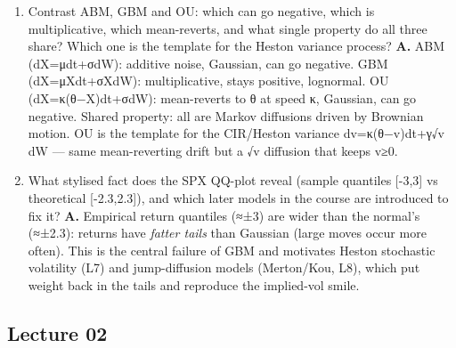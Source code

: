\documentclass[
  11pt,
]{article}
\begin{document}
\begin{enumerate}
  the one-step-ahead conditional law given the present equals that given
  the whole past --- history beyond S\_t carries no extra information,
  which is precisely weak-form efficiency (prices reflect past prices).
  i.i.d. returns make the \emph{entire} history useless, which certainly
  gives Markov/weak-form; but weak-form only requires the one-step
  conditional law to be unchanged by deeper history, a strictly weaker
  condition than full independence and identical distribution --- so the
  converse fails.
\item
  Contrast ABM, GBM and OU: which can go negative, which is
  multiplicative, which mean-reverts, and what single property do all
  three share? Which one is the template for the Heston variance
  process? \textbf{A.} ABM (dX=μdt+σdW): additive noise, Gaussian, can
  go negative. GBM (dX=μXdt+σXdW): multiplicative, stays positive,
  lognormal. OU (dX=κ(θ−X)dt+σdW): mean-reverts to θ at speed κ,
  Gaussian, can go negative. Shared property: all are Markov diffusions
  driven by Brownian motion. OU is the template for the CIR/Heston
  variance dv=κ(θ−v)dt+γ√v dW --- same mean-reverting drift but a √v
  diffusion that keeps v≥0.
\item
  What stylised fact does the SPX QQ-plot reveal (sample quantiles
  {[}-3,3{]} vs theoretical {[}-2.3,2.3{]}), and which later models in
  the course are introduced to fix it? \textbf{A.} Empirical return
  quantiles (≈±3) are wider than the normal's (≈±2.3): returns have
  \emph{fatter tails} than Gaussian (large moves occur more often). This
  is the central failure of GBM and motivates Heston stochastic
  volatility (L7) and jump-diffusion models (Merton/Kou, L8), which put
  weight back in the tails and reproduce the implied-vol smile.
\end{enumerate}

\hypertarget{lecture-02}{%
\subsection{Lecture 02}\label{lecture-02}}
\end{document}
